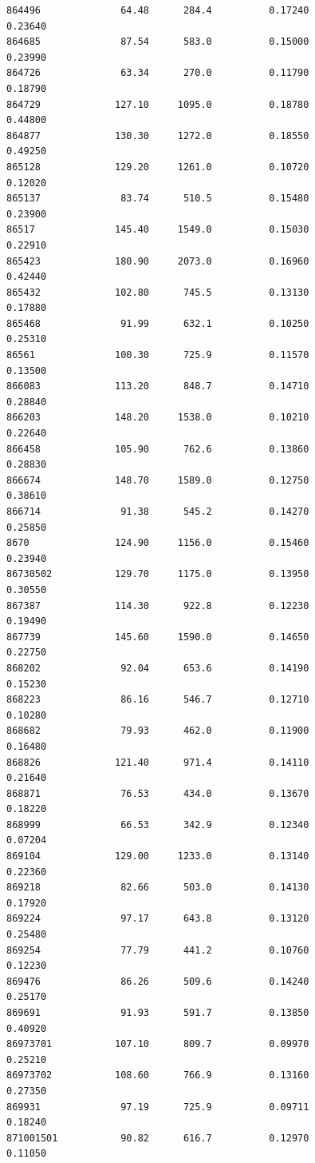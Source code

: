 \documentclass[
  letterpaper,
  DIV=11,
  numbers=noendperiod]{scrartcl}
\begin{document}
\begin{verbatim}
864496              64.48      284.4          0.17240           0.23640
864685              87.54      583.0          0.15000           0.23990
864726              63.34      270.0          0.11790           0.18790
864729             127.10     1095.0          0.18780           0.44800
864877             130.30     1272.0          0.18550           0.49250
865128             129.20     1261.0          0.10720           0.12020
865137              83.74      510.5          0.15480           0.23900
86517              145.40     1549.0          0.15030           0.22910
865423             180.90     2073.0          0.16960           0.42440
865432             102.80      745.5          0.13130           0.17880
865468              91.99      632.1          0.10250           0.25310
86561              100.30      725.9          0.11570           0.13500
866083             113.20      848.7          0.14710           0.28840
866203             148.20     1538.0          0.10210           0.22640
866458             105.90      762.6          0.13860           0.28830
866674             148.70     1589.0          0.12750           0.38610
866714              91.38      545.2          0.14270           0.25850
8670               124.90     1156.0          0.15460           0.23940
86730502           129.70     1175.0          0.13950           0.30550
867387             114.30      922.8          0.12230           0.19490
867739             145.60     1590.0          0.14650           0.22750
868202              92.04      653.6          0.14190           0.15230
868223              86.16      546.7          0.12710           0.10280
868682              79.93      462.0          0.11900           0.16480
868826             121.40      971.4          0.14110           0.21640
868871              76.53      434.0          0.13670           0.18220
868999              66.53      342.9          0.12340           0.07204
869104             129.00     1233.0          0.13140           0.22360
869218              82.66      503.0          0.14130           0.17920
869224              97.17      643.8          0.13120           0.25480
869254              77.79      441.2          0.10760           0.12230
869476              86.26      509.6          0.14240           0.25170
869691              91.93      591.7          0.13850           0.40920
86973701           107.10      809.7          0.09970           0.25210
86973702           108.60      766.9          0.13160           0.27350
869931              97.19      725.9          0.09711           0.18240
871001501           90.82      616.7          0.12970           0.11050

\end{verbatim}
\end{document}
